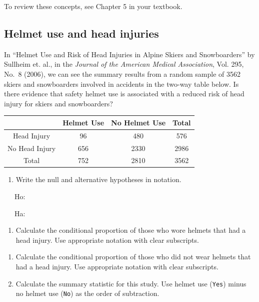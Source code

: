 \documentclass[
]{report}
\providecommand{\tightlist}{%
  \setlength{\itemsep}{0pt}\setlength{\parskip}{0pt}}
\begin{document}
To review these concepts, see Chapter 5 in your textbook.

\hypertarget{helmet-use-and-head-injuries}{%
\subsection{Helmet use and head injuries}\label{helmet-use-and-head-injuries}}

In ``Helmet Use and Risk of Head Injuries in Alpine Skiers and Snowboarders'' by Sullheim et. al., in the \emph{Journal of the American Medical Association}, Vol. 295, No.~8 (2006), we can see the summary results from a random sample of 3562 skiers and snowboarders involved in accidents in the two-way table below. Is there evidence that safety helmet use is associated with a reduced risk of head injury for skiers and snowboarders?

\begin{longtable}[]{@{}cccc@{}}
\toprule
& Helmet Use & No Helmet Use & Total \\
\midrule
\endhead
Head Injury & 96 & 480 & 576 \\
No Head Injury & 656 & 2330 & 2986 \\
Total & 752 & 2810 & 3562 \\
\bottomrule
\end{longtable}

\newpage

\begin{enumerate}
\def\labelenumi{\arabic{enumi}.}
\tightlist
\item
  Write the null and alternative hypotheses in notation.
\end{enumerate}

~~~Ho:

\vspace{0.2in}

~~~Ha:

\vspace{0.2in}

\begin{enumerate}
\def\labelenumi{\arabic{enumi}.}
\setcounter{enumi}{1}
\tightlist
\item
  Calculate the conditional proportion of those who wore helmets that had a head injury. Use appropriate notation with clear subscripts.
\end{enumerate}

\vspace{0.3in}

\begin{enumerate}
\def\labelenumi{\arabic{enumi}.}
\setcounter{enumi}{2}
\item
  Calculate the conditional proportion of those who did not wear helmets that had a head injury. Use appropriate notation with clear subscripts.
  \vspace{0.3in}
\item
  Calculate the summary statistic for this study. Use helmet use (\texttt{Yes}) minus no helmet use (\texttt{No}) as the order of subtraction.
\end{enumerate}
\end{document}
